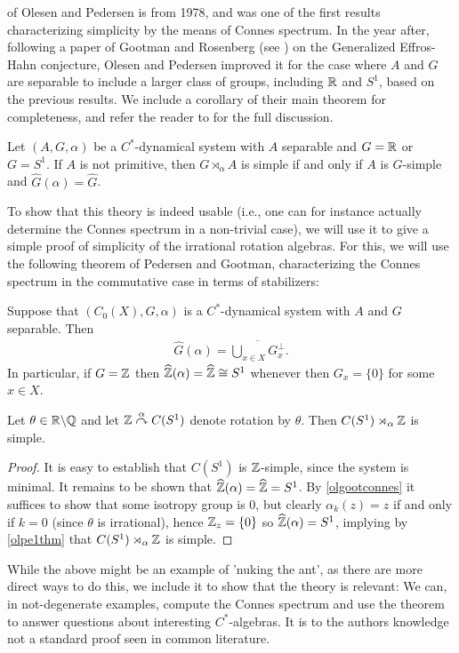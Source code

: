  of Olesen and Pedersen is from 1978, and was one of the first results characterizing simplicity by the means of Connes spectrum. In the year after, following a paper of Gootman and Rosenberg (see \cite{gootman1979structure}) on the Generalized Effros-Hahn conjecture, Olesen and Pedersen improved it for the case where $A$ and $G$ are separable to include a larger class of groups, including $\mathbb{R}$ and $S^1$, based on the previous results. We include a corollary of their main theorem for completeness, and refer the reader to \cite{olesenpedersen2} for the full discussion.
\begin{corollary}
	Let $(A,G,\alpha)$ be a $C^*$-dynamical system with $A$ separable and $G = \mathbb{R}$ or $G=S^1$. If $A$ is not primitive, then $G \rtimes_\alpha A$ is simple if and only if $A$ is $G$-simple and $\hat G(\alpha) = \hat G$.
\end{corollary}

To show that this theory is indeed usable (i.e., one can for instance actually determine the Connes spectrum in a non-trivial case), we will use it to give a simple proof of simplicity of the irrational rotation algebras. For this, we will use the following theorem of Pedersen and Gootman, characterizing the Connes spectrum in the commutative case in terms of stabilizers:
\begin{theorem}
	Suppose that $(C_0(X),G,\alpha)$ is a $C^*$-dynamical system with $A$ and $G$ separable. Then
	\begin{align*}
		\hat G(\alpha) = \overline{\bigcup_{x \in X} G_x^\perp}.
	\end{align*}
	In particular, if $G = \mathbb{Z}$ then $\widehat{\mathbb{Z}}(\alpha) = \widehat{\mathbb{Z}} \cong S^1$ whenever then $G_x=\{0\}$ for some $x \in X$.
	\label{olgootconnes}
\end{theorem}
\begin{example}
	Let $\theta \in \mathbb{R} \backslash \mathbb{Q}$ and let $\mathbb{Z} \stackrel{\alpha}{\curvearrowright} C(S^1)$ denote rotation by $\theta$. Then $C(S^1) \rtimes_\alpha \mathbb{Z}$ is simple.
\end{example}
\begin{proof}
	It is easy to establish that $C(S^1)$ is $\mathbb{Z}$-simple, since the system is minimal. It remains to be shown that $\widehat{\mathbb{Z}}(\alpha) = \widehat{\mathbb{Z}} = S^1$. By \cref{olgootconnes} it suffices to show that some isotropy group is $0$, but clearly $\alpha_k(z) = z$ if and only if $k = 0$ (since $\theta$ is irrational), hence $\mathbb{Z}_{z} = \{0\}$ so $\widehat{\mathbb{Z}} (\alpha) = S^1$, implying by \cref{olpe1thm} that $C(S^1) \rtimes_\alpha \mathbb{Z}$ is simple.
\end{proof}
While the above might be an example of 'nuking the ant', as there are more direct ways to do this, we include it to show that the theory is relevant: We can, in not-degenerate examples, compute the Connes spectrum and use the theorem to answer questions about interesting $C^*$-algebras. It is to the authors knowledge not a standard proof seen in common literature.

